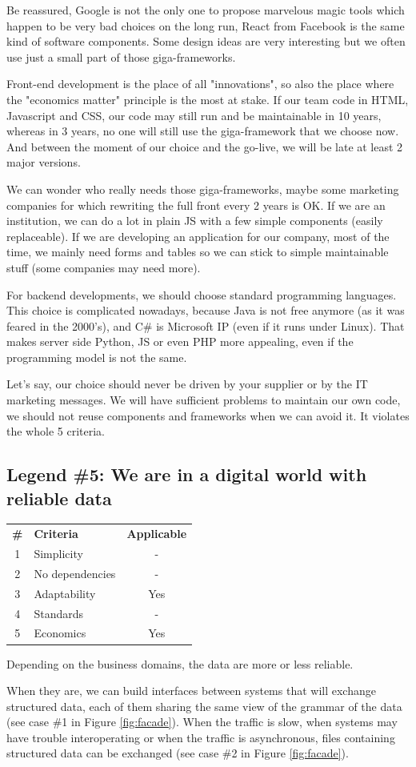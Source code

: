\documentclass[]{article}
\newcommand{\criterias}[5]
{\begin{center}
\rowcolors{2}{gray!25}{white}
{\small\begin{tabular}{clc}
\rowcolor{gray!50}
\textbf{\#} & \textbf{Criteria} & \textbf{Applicable} \\
1 & Simplicity      & #1 \\
2 & No dependencies & #2 \\
3 & Adaptability    & #3 \\
4 & Standards       & #4 \\
5 & Economics       & #5 \\
\end{tabular}}
\end{center}}
\begin{document}
Be reassured, Google is not the only one to propose marvelous magic tools which happen to be very bad choices on the long run, React from Facebook is the same kind of software components. Some design ideas are very interesting but we often use just a small part of those giga-frameworks.

Front-end development is the place of all "innovations", so also the place where the "economics matter" principle is the most at stake. If our team code in HTML, Javascript and CSS, our code may still run and be maintainable in 10 years, whereas in 3 years, no one will still use the giga-framework that we choose now. And between the moment of our choice and the go-live, we will be late at least 2 major versions.

We can wonder who really needs those giga-frameworks, maybe some marketing companies for which rewriting the full front every 2 years is OK. If we are an institution, we can do a lot in plain JS with a few simple components (easily replaceable). If we are developing an application for our company, most of the time, we mainly need forms and tables so we can stick to simple maintainable stuff (some companies may need more).

For backend developments, we should choose standard programming languages. This choice is complicated nowadays, because Java is not free anymore (as it was feared in the 2000's), and C\# is Microsoft IP (even if it runs under Linux). That makes server side Python, JS or even PHP more appealing, even if the programming model is not the same.

Let's say, our choice should never be driven by your supplier or by the IT marketing messages. We will have sufficient problems to maintain our own code, we should not reuse components and frameworks when we can avoid it. It violates the whole 5 criteria.

\subsection{Legend \#5: We are in a digital world with reliable data}

\criterias{-}{-}{Yes}{-}{Yes}

Depending on the business domains, the data are more or less reliable.

When they are, we can build interfaces between systems that will exchange structured data, each of them sharing the same view of the grammar of the data (see case \#1 in Figure \ref{fig:facade}). When the traffic is slow, when systems may have trouble interoperating or when the traffic is asynchronous, files containing structured data can be exchanged (see case \#2 in Figure \ref{fig:facade}).
\end{document}

